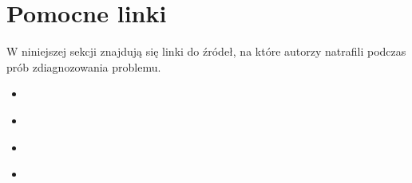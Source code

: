 \documentclass[10pt,a4paper]{article}
\begin{document}
\section{Pomocne linki}
W niniejszej sekcji znajdują się linki do źródeł, na które autorzy natrafili podczas prób zdiagnozowania problemu.
\begin{itemize}
\item \cite[Atrykuł przedstawiający ładowanie ShapeFile do bazy danych PostGIS]{loadShpDataIntoPostGis}
\item \cite[Atrykuł pokazujący obsługę GeoSerwera]{servepostgisdata1}
\item \cite[Wątek opisujący załadowanie pliku z bazą danych eESRI i konwersje fo Shapefile'a]{loadESRIDataAndConvertToShape}
\item \cite[Strona Wiki opisująca sposób ekstrakcji danych geograficznych do bazy postGisowej]{osmToPostGIS}
\end{itemize}
{}

\end{document}
